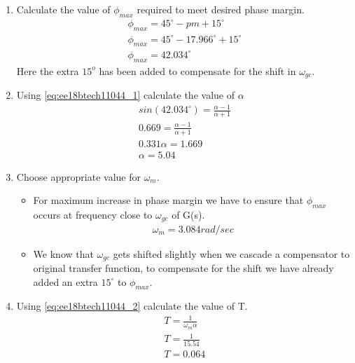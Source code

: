 \begin{enumerate}[label=\thesection.\arabic*.,ref=\thesection.\theenumi]
\item Calculate the value of $\phi_{max}$ required to meet desired phase margin. \\
\solution 
\begin{align}
    \phi_{max} = 45^{\circ} - pm + 15^{\circ} \\ 
    \phi_{max} = 45^{\circ} - 17.966^{\circ} + 15^{\circ} \\
    \phi_{max} = 42.034^{\circ}
\end{align}
Here the extra $15^o$ has been added to compensate for the shift in $\omega_{gc}$.  
\item Using \eqref{eq:ee18btech11044_1} calculate the value of $\alpha$ \\
\solution 
\begin{align}
    sin(42.034^{\circ}) = \frac{\alpha - 1}{\alpha + 1} \\
    0.669 = \frac{\alpha - 1}{\alpha + 1} \\ 
    0.331 \alpha = 1.669 \\
    \alpha = 5.04
\end{align}
\item Choose appropriate value for $\omega_m$. \\
\solution 
\begin{itemize}
    \item For maximum increase in phase margin we have to ensure that $\phi_{max}$ occurs at frequency close to $\omega_{gc}$ of G(s).
    \begin{align}
        \omega_m = 3.084 rad/sec
    \end{align}
    \item We know that $\omega_{gc}$ gets shifted slightly when we cascade a compensator to original transfer function, to compensate for the shift we have already added an extra $15^{\circ}$ to $\phi_{max}$.
\end{itemize}

\item Using \eqref{eq:ee18btech11044_2} calculate the value of T. \\
\solution
\begin{align}
    T = \frac{1}{ \omega_m \alpha} \\
    T = \frac{1}{15.54} \\
    T = 0.064
\end{align}


\end{enumerate}
